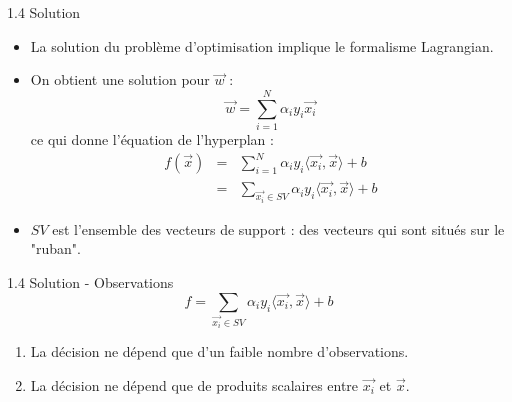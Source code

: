 \begin{frame}{1.4 Solution}
  \begin{itemize}
    \item La solution du problème d'optimisation implique le formalisme Lagrangian. 
    \item On obtient une solution pour $\overrightarrow{w}$ : 
    \begin{equation*}
      \overrightarrow{w} = \sum_{i=1}^N\alpha_iy_i\overrightarrow{x_i}
    \end{equation*}
    ce qui donne l'équation de l'hyperplan : 
    \begin{eqnarray*}
      f(\overrightarrow{x}) &=& \sum_{i=1}^N\alpha_iy_i\langle \overrightarrow{x_i}, \overrightarrow{x} \rangle + b\\
      &=& \sum_{\overrightarrow{x_i} \in SV}\alpha_iy_i\langle \overrightarrow{x_i}, \overrightarrow{x} \rangle + b
    \end{eqnarray*}
    \item $SV$ est l'ensemble des vecteurs de support : des vecteurs qui sont situés sur le "ruban". 
  \end{itemize}
\end{frame}

\begin{frame}{1.4 Solution - Observations}
  \begin{equation*}
  f = \sum_{\overrightarrow{x_i} \in SV}\alpha_iy_i\langle \overrightarrow{x_i}, \overrightarrow{x} \rangle + b
  \end{equation*}
  \begin{enumerate}
    \item La décision ne dépend que d'un faible nombre d'observations.
    \item La décision ne dépend que de produits scalaires entre $\overrightarrow{x_i}$ et $\overrightarrow{x}$. 
  \end{enumerate}
\end{frame}



